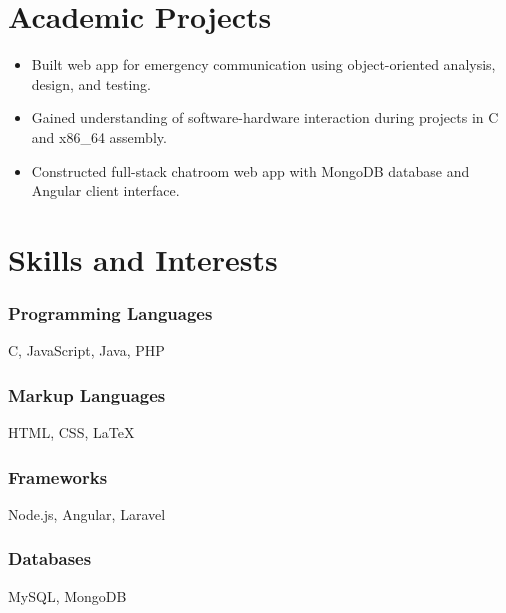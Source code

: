 \documentclass[12pt]{res} %
\begin{document}
\begin{resume}
        \section{Academic Projects}
          \begin{itemize}[leftmargin=-0.4cm]
          \itemsep0em
          \item Built web app for emergency communication using object-oriented analysis, design, and testing.
          \item Gained understanding of software-hardware interaction during projects in C and x86\_64 assembly.
          \item Constructed full-stack chatroom web app with MongoDB database and Angular client interface.
          \end{itemize}
          \vspace{-12pt}

        \section{Skills and Interests}
          \vspace{3pt}

          \begin{multicols}{3}

            \subsubsection{Programming Languages}
            \vspace{-22pt}
            C, JavaScript, Java, PHP
            \vspace{-28pt}

            \subsubsection{Markup Languages}
            \vspace{-22pt}
            HTML, CSS, \LaTeX
            \vspace{-28pt}

            \subsubsection{Frameworks}
            \vspace{-22pt}
            Node.js, Angular, Laravel
            \vspace{-28pt}

            \subsubsection{Databases}
            \vspace{-22pt}
            MySQL, MongoDB
            \vspace{-28pt}


\end{multicols}
\end{resume}
\end{document}
